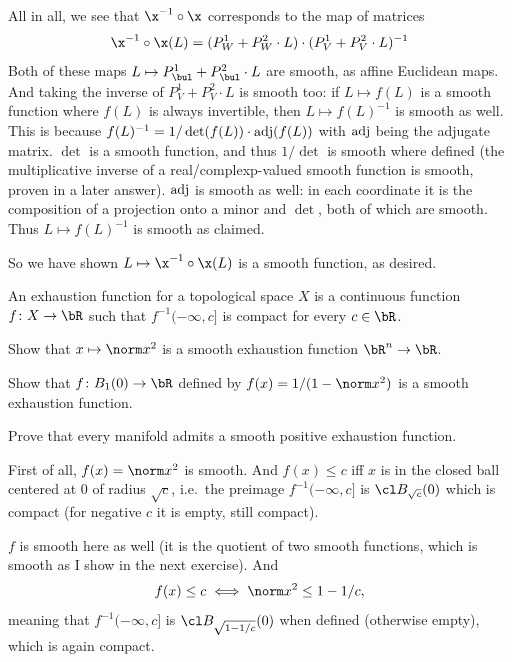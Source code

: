     All in all, we see that $\x^{-1}\circ\x$ corresponds to the map of matrices
    $$ \x^{-1}\circ\x(L) = (P^1_W+P^2_W\cdot L)\cdot(P^1_V+P^2_V\cdot L)^{-1} $$
    Both of these maps $L\mapsto P^1_\bul+P^2_\bul\cdot L$ are smooth, as affine Euclidean maps.
    And taking the inverse of $P^1_V+P^2_V\cdot L$ is smooth too: if $L\mapsto f(L)$ is a smooth function where $f(L)$ is always invertible, then $L\mapsto f(L)^{-1}$ is smooth as well.
    This is because $f(L)^{-1}=1/\det(f(L))\cdot{\rm adj}(f(L))$ with ${\rm adj}$ being the adjugate matrix.
    $\det$ is a smooth function, and thus $1/\det$ is smooth where defined (the multiplicative inverse of a real/complexp-valued smooth function is smooth, proven in a later answer).
    ${\rm adj}$ is smooth as well: in each coordinate it is the composition of a projection onto a minor and $\det$, both of which are smooth.
    Thus $L\mapsto f(L)^{-1}$ is smooth as claimed.

    So we have shown $L\mapsto\x^{-1}\circ\x(L)$ is a smooth function, as desired.
\eenum

\bprob

    An {\emphcolor exhaustion function} for a topological space $X$ is a continuous function
    $f\colon X\to\bR$ such that $f^{-1}(-\infty,c]$ is compact for every $c\in\bR$.
    \benum
        \item Show that $x\mapsto\norm x^2$ is a smooth exhaustion function $\bR^n\to\bR$.
        \item Show that $f\colon B_1(0)\to\bR$ defined by $f(x)=1/(1-\norm x^2)$ is a smooth exhaustion
        function.
        \item Prove that every manifold admits a smooth positive exhaustion function.
    \eenum

\eprob

\benum
    \item First of all, $f(x)=\norm x^2$ is smooth.
    And $f(x)\leq c$ iff $x$ is in the closed ball centered at $0$ of radius $\sqrt c$, i.e.\ the preimage
    $f^{-1}(-\infty,c]$ is $\cl B_{\sqrt c}(0)$ which is compact (for negative $c$ it is empty, still compact).

    \item $f$ is smooth here as well (it is the quotient of two smooth functions, which is smooth as I show
    in the next exercise).
    And
    $$ f(x) \leq c \iff \norm x^2 \leq 1-1/c , $$
    meaning that $f^{-1}(-\infty,c]$ is $\cl B_{\sqrt{1-1/c}}(0)$ when defined (otherwise empty), which
    is again compact.

